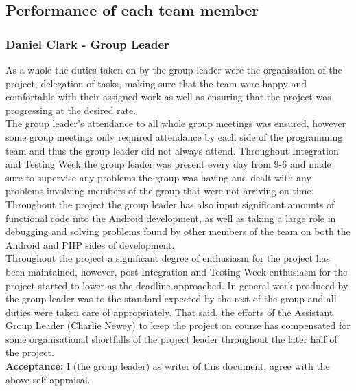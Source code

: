 \documentclass{article}
\begin{document}
		\subsection{Performance of each team member}
		\subsubsection{Daniel Clark - Group Leader}
		As a whole the duties taken on by the group leader were the organisation of the project, delegation of tasks, making sure that the team were happy and comfortable with their assigned work as well as ensuring that the project was progressing at the desired rate. \\
		
		The group leader's attendance to all whole group meetings was ensured, however some group meetings only required attendance by each side of the programming team and thus the group leader did not always attend. Throughout Integration and Testing Week the group leader was present every day from 9-6 and made sure to supervise any problems the group was having and dealt with any problems involving members of the group that were not arriving on time. Throughout the project the group leader has also input significant amounts of functional code into the Android development, as well as taking a large role in debugging and solving problems found by other members of the team on both the Android and PHP sides of development. \\
		
		Throughout the project a significant degree of enthusiasm for the project has been maintained, however, post-Integration and Testing Week enthusiasm for the project started to lower as the deadline approached. In general work produced by the group leader was to the standard expected by the rest of the group and all duties were taken care of appropriately. That said, the efforts of the Assistant Group Leader (Charlie Newey) to keep the project on course has compensated for some organisational shortfalls of the project leader throughout the later half of the project. \\
		
		{\bf Acceptance:} I (the group leader) as writer of this document, agree with the above self-appraisal.
\end{document}
